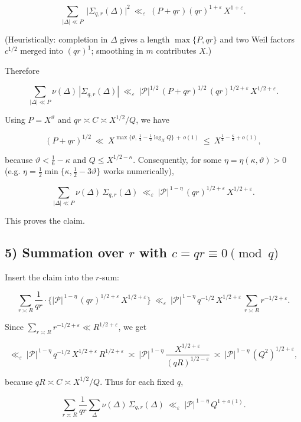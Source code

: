 \documentclass[11pt]{article}
\theoremstyle{definition}
\theoremstyle{remark}
\begin{document}
$$
\sum_{|\Delta|\ll P}\ \big|\Sigma_{q,r}(\Delta)\big|^2
\ \ll_\varepsilon\ (P+qr) (qr)^{1+\varepsilon}\, X^{1+\varepsilon}.
$$

(Heuristically: completion in $\Delta$ gives a length $\max\{P,qr\}$ and two Weil factors $c^{1/2}$ merged into $(qr)^{1}$; smoothing in $m$ contributes $X$.)

Therefore

$$
\sum_{|\Delta|\ll P}\nu(\Delta)\,|\Sigma_{q,r}(\Delta)|
\ \ll_\varepsilon\ |\mathcal P|^{1/2}\,(P+qr)^{1/2}\,(qr)^{1/2+\varepsilon}\,X^{1/2+\varepsilon}.
$$

Using $P=X^{\vartheta}$ and $qr\asymp C\asymp X^{1/2}/Q$, we have

$$
(P+qr)^{1/2}\ \ll\ X^{\max\{\vartheta,\,\tfrac14-\tfrac12\log_X Q\}\,+\,o(1)}
\ \le\ X^{\tfrac14-\tfrac\kappa2+o(1)},
$$

because $\vartheta<\tfrac16-\kappa$ and $Q\le X^{1/2-\kappa}$. Consequently, for some $\eta=\eta(\kappa,\vartheta)>0$ (e.g. $\eta=\tfrac12\min\{\kappa,\tfrac12-3\vartheta\}$ works numerically),

$$
\sum_{|\Delta|\ll P}\nu(\Delta)\,\Sigma_{q,r}(\Delta)
\ \ll_\varepsilon\ |\mathcal P|^{\,1-\eta}\,(qr)^{1/2+\varepsilon}\,X^{1/2+\varepsilon}.
$$

This proves the claim.

\subsection*{5) Summation over $r$ with $c=qr\equiv0\pmod q$}

Insert the claim into the $r$-sum:

$$
\sum_{r\asymp R}\frac{1}{qr}\cdot
\Big\{|\mathcal P|^{\,1-\eta}\,(qr)^{1/2+\varepsilon}\,X^{1/2+\varepsilon}\Big\}
\ \ll_\varepsilon\ |\mathcal P|^{\,1-\eta}\, q^{-1/2}\,X^{1/2+\varepsilon}\,
\sum_{r\asymp R} r^{-1/2+\varepsilon}.
$$

Since $\sum_{r\asymp R} r^{-1/2+\varepsilon}\ll R^{1/2+\varepsilon}$, we get

$$
\ll_\varepsilon\ |\mathcal P|^{\,1-\eta}\, q^{-1/2}\,X^{1/2+\varepsilon}\,R^{1/2+\varepsilon}
\ \asymp\ |\mathcal P|^{\,1-\eta}\, \frac{X^{1/2+\varepsilon}}{(qR)^{1/2-\varepsilon}}
\ \asymp\ |\mathcal P|^{\,1-\eta}\, (Q^2)^{1/2+\varepsilon},
$$

because $qR\asymp C\asymp X^{1/2}/Q$. Thus for each fixed $q$,

$$
\sum_{r\asymp R}\frac{1}{qr}\sum_{\Delta}\nu(\Delta)\,\Sigma_{q,r}(\Delta)
\ \ll_\varepsilon\ |\mathcal P|^{\,1-\eta}\,Q^{1+o(1)}.
$$
\end{document}
